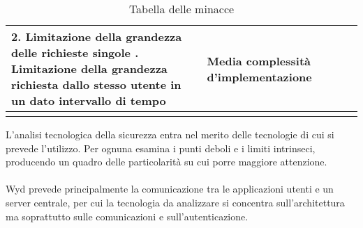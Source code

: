 \begin{longtable}{|P{3.3cm}|P{1.6cm}|P{6.2cm}|P{4cm}|}
    2. Limitazione della grandezza delle richieste singole . Limitazione della grandezza richiesta dallo stesso utente in un dato intervallo di tempo & Media complessità d'implementazione                                                                                                                                                                     \\
    \hline
    \caption{Tabella delle minacce}
\end{longtable}

\clearpage

L'analisi tecnologica della sicurezza entra nel merito 
delle tecnologie di cui si prevede l'utilizzo.
Per ognuna esamina i punti deboli e i limiti intrinseci,
producendo un quadro delle particolarità su cui porre maggiore attenzione.\\
\\
Wyd prevede principalmente la comunicazione tra le applicazioni utenti e un server centrale,
per cui la tecnologia da analizzare si concentra sull'architettura
ma soprattutto sulle comunicazioni e sull'autenticazione.\\


